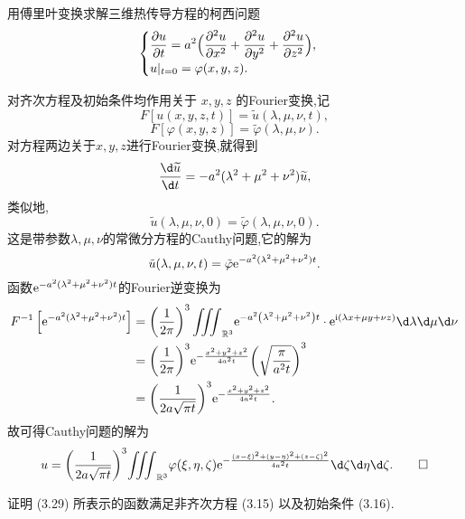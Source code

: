 \begin{exercise}
	用傅里叶变换求解三维热传导方程的柯西问题
	\[\begin{cases}
		\displaystyle\frac{\partial u}{\partial t} = a^2 \Bigl(\frac{\partial^2 u}{\partial x^2}+\frac{\partial^2 u}{\partial y^2}+\frac{\partial^2 u}{\partial z^2}\Bigr), \\
		u|_{t=0} = \varphi(x,y,z).
	\end{cases}\]
\end{exercise}

\begin{solve}
	对齐次方程及初始条件均作用关于 $x,y,z$ 的Fourier变换,记 $$F[u(x,y,z,t)]=\tilde{u}(\lambda,\mu,\nu,t),$$
	$$F[\varphi(x,y,z)]=\tilde{\varphi}(\lambda,\mu,\nu).$$
	对方程两边关于$x,y,z$进行Fourier变换,就得到
	$$\frac{\d\widetilde{u}}{\d t} = -a^{2}(\lambda^2+\mu^2+\nu^2)\widetilde{u},$$
	类似地,
	$$\tilde{u}(\lambda,\mu,\nu,0) = \tilde{\varphi}(\lambda,\mu,\nu,0).$$
	这是带参数$\lambda,\mu,\nu$的常微分方程的Cauthy问题,它的解为
	$$\tilde{u}(\lambda,\mu,\nu,t)=\tilde{\varphi}\mathrm{e}^{-a^2(\lambda^2+\mu^2+\nu^2)t}.$$
	函数$\mathrm{e}^{-a^2(\lambda^2+\mu^2+\nu^2)t}$的Fourier逆变换为
	\begin{align*}
		F^{-1}\left[\e^{-a^2(\lambda^2+\mu^2+\nu^2)t}\right]&=\left(\frac{1}{2\pi}\right)^3{\iiint}_{\mathbb{R}^3}\e^{-a^2\left(\lambda^2+\mu^2+\nu^2\right)t}\cdot\e^{\upi(\lambda x+\mu y+\nu z)}\d\lambda\d\mu\d\nu\\
		&= {\left(\frac{1}{2\pi} \right)}^{3}\e^{{-}\frac{x^2+y^2+z^2}{4a^2t}}{\left( \sqrt{\frac{\pi}{a^2t}} \right)}^3\\
		&= {\left(\frac{1}{2a\sqrt{\pi t}}\right)}^3\e^{-\frac{x^2+y^2+z^2}{4a^2t}}.
	\end{align*}
	故可得Cauthy问题的解为
	\[u={\left(\frac{1}{2a\sqrt{\pi t}} \right)}^3{{\iiint}}_{{\mathbb{R}}^{3}}\varphi(\xi,\eta,\zeta)\e^{-\frac{{(x {-} \xi)}^{2} + {(y-\eta)}^2+{(z-\zeta)}^2}{4a^2t}}\d\zeta\d\eta\d\zeta.\qedhere\]
\end{solve}

\begin{exercise}[4]
  证明 (3.29) 所表示的函数满足非齐次方程 (3.15) 以及初始条件 (3.16).
\end{exercise}

